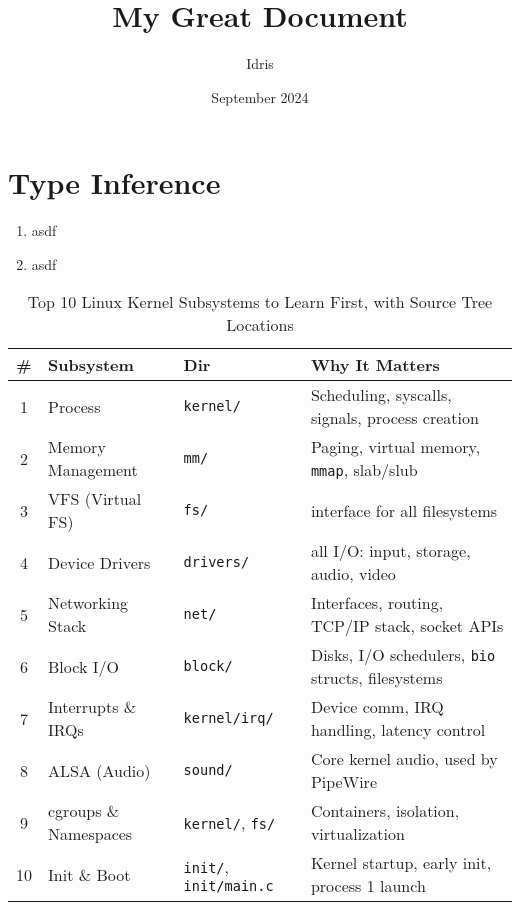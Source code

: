 \documentclass[openany, 12pt]{book}
\title{My Great Document}
\author{Idris}
\date{September 2024}
\begin{document}
\maketitle{}
\tableofcontents

\listoffigures
\listoftables

\chapter{Type Inference}

\begin{enumerate}[label = {(\alph*)}]
  \item asdf
  \item asdf
\end{enumerate}

\begin{table}[h]
  \centering
  \begin{tabular}{clll}
    \toprule
    \textbf{\#} & \textbf{Subsystem}    & \textbf{Dir}                         & \textbf{Why It Matters}                                  \\
    \midrule
    1           & Process               & \texttt{kernel/}                     & Scheduling, syscalls, signals, process creation          \\
    2           & Memory Management     & \texttt{mm/}                         & Paging, virtual memory, \texttt{mmap}, slab/slub         \\
    3           & VFS (Virtual FS)      & \texttt{fs/}                         & interface for all filesystems                            \\
    4           & Device Drivers        & \texttt{drivers/}                    & all I/O: input, storage, audio, video                    \\
    5           & Networking Stack      & \texttt{net/}                        & Interfaces, routing, TCP/IP stack, socket APIs           \\
    6           & Block I/O             & \texttt{block/}                      & Disks, I/O schedulers, \texttt{bio} structs, filesystems \\
    7           & Interrupts \& IRQs    & \texttt{kernel/irq/}                 & Device comm, IRQ handling, latency control               \\
    8           & ALSA (Audio)          & \texttt{sound/}                      & Core kernel audio, used by PipeWire                      \\
    9           & cgroups \& Namespaces & \texttt{kernel/}, \texttt{fs/}       & Containers, isolation, virtualization                    \\
    10          & Init \& Boot          & \texttt{init/}, \texttt{init/main.c} & Kernel startup, early init, process 1 launch             \\
    \bottomrule
  \end{tabular}
  \caption{Top 10 Linux Kernel Subsystems to Learn First, with Source Tree Locations}
\end{table}
\end{document}

